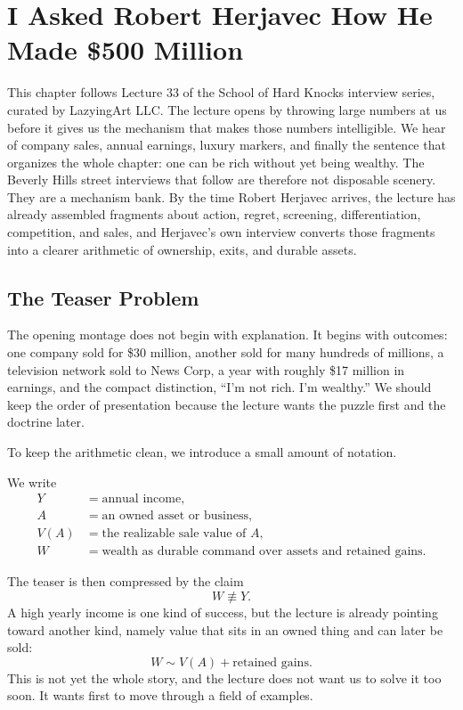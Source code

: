 \chapter{I Asked Robert Herjavec How He Made \$500 Million}

This chapter follows Lecture 33 of the School of Hard Knocks interview series, curated by LazyingArt LLC. The lecture opens by throwing large numbers at us before it gives us the mechanism that makes those numbers intelligible. We hear of company sales, annual earnings, luxury markers, and finally the sentence that organizes the whole chapter: one can be rich without yet being wealthy. The Beverly Hills street interviews that follow are therefore not disposable scenery. They are a mechanism bank. By the time Robert Herjavec arrives, the lecture has already assembled fragments about action, regret, screening, differentiation, competition, and sales, and Herjavec's own interview converts those fragments into a clearer arithmetic of ownership, exits, and durable assets.

\section{The Teaser Problem}

The opening montage does not begin with explanation. It begins with outcomes: one company sold for \$30 million, another sold for many hundreds of millions, a television network sold to News Corp, a year with roughly \$17 million in earnings, and the compact distinction, ``I'm not rich. I'm wealthy.'' We should keep the order of presentation because the lecture wants the puzzle first and the doctrine later.

To keep the arithmetic clean, we introduce a small amount of notation.

\begin{definition}
We write
\begin{align}
Y &= \text{annual income},\\
A &= \text{an owned asset or business},\\
V(A) &= \text{the realizable sale value of }A,\\
W &= \text{wealth as durable command over assets and retained gains}.
\end{align}
\end{definition}

The teaser is then compressed by the claim
\begin{equation}
W \not\equiv Y.
\end{equation}
A high yearly income is one kind of success, but the lecture is already pointing toward another kind, namely value that sits in an owned thing and can later be sold:
\begin{equation}
W \sim V(A) + \text{retained gains}.
\end{equation}
This is not yet the whole story, and the lecture does not want us to solve it too soon. It wants first to move through a field of examples.

